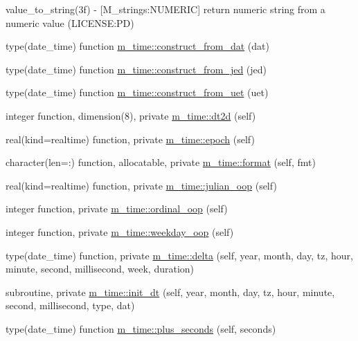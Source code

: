\begin{DoxyCompactItemize}
\begin{DoxyCompactList}
value\+\_\+to\+\_\+string(3f) -\/ \mbox{[}M\+\_\+strings\+:N\+U\+M\+E\+R\+IC\mbox{]} return numeric string from a numeric value (L\+I\+C\+E\+N\+SE\+:PD) \end{DoxyCompactList}\item 
type(date\+\_\+time) function \mbox{\hyperlink{namespacem__time_a6f7d20403f29656febb82306aa064134}{m\+\_\+time\+::construct\+\_\+from\+\_\+dat}} (dat)
\item 
type(date\+\_\+time) function \mbox{\hyperlink{namespacem__time_ab7b679d14dabc2a9250f4ec218569f0c}{m\+\_\+time\+::construct\+\_\+from\+\_\+jed}} (jed)
\item 
type(date\+\_\+time) function \mbox{\hyperlink{namespacem__time_a7d903e5ff714106d933cee618e780a8b}{m\+\_\+time\+::construct\+\_\+from\+\_\+uet}} (uet)
\item 
integer function, dimension(8), private \mbox{\hyperlink{namespacem__time_aa281690d7f68f14842b00d238702e774}{m\+\_\+time\+::dt2d}} (self)
\item 
real(kind=realtime) function, private \mbox{\hyperlink{namespacem__time_a64abb0c3f90cb0ae1358ef55ce03c175}{m\+\_\+time\+::epoch}} (self)
\item 
character(len=\+:) function, allocatable, private \mbox{\hyperlink{namespacem__time_a8d843c997d304f40fd5aed820c5a7473}{m\+\_\+time\+::format}} (self, fmt)
\item 
real(kind=realtime) function, private \mbox{\hyperlink{namespacem__time_aff0a1b524b578e85efe20b87fbe9db61}{m\+\_\+time\+::julian\+\_\+oop}} (self)
\item 
integer function, private \mbox{\hyperlink{namespacem__time_a7fb507bb72a1872ec2a86fb7f3a50d75}{m\+\_\+time\+::ordinal\+\_\+oop}} (self)
\item 
integer function, private \mbox{\hyperlink{namespacem__time_ac43e082c8ffd7687c4fc91beddc15720}{m\+\_\+time\+::weekday\+\_\+oop}} (self)
\item 
type(date\+\_\+time) function, private \mbox{\hyperlink{namespacem__time_aa623b1643e55ffbf97e4fbd1c7e8c379}{m\+\_\+time\+::delta}} (self, year, month, day, tz, hour, minute, second, millisecond, week, duration)
\item 
subroutine, private \mbox{\hyperlink{namespacem__time_a72455f763954fae8ebc0f454033d82a8}{m\+\_\+time\+::init\+\_\+dt}} (self, year, month, day, tz, hour, minute, second, millisecond, type, dat)
\item 
type(date\+\_\+time) function \mbox{\hyperlink{namespacem__time_a76e79ee87552ce537cbb674a21b05b5c}{m\+\_\+time\+::plus\+\_\+seconds}} (self, seconds)

\end{DoxyCompactItemize}
